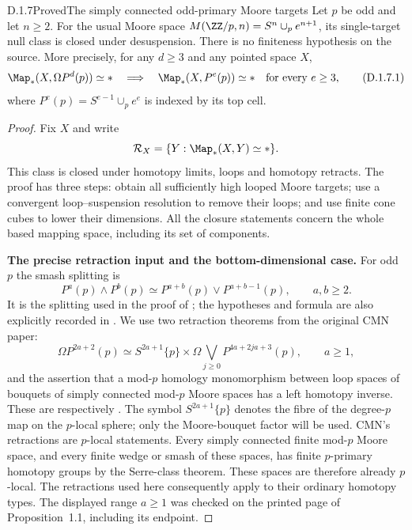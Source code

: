 \begin{claim}{D.1.7}{Proved}{The simply connected odd-primary Moore targets}
Let $p$ be odd and let $n\geq2$. For the usual Moore space
$M(\ZZ/p,n)=S^n\cup_p e^{n+1}$, its single-target null class is
closed under desuspension. There is no finiteness hypothesis on the
source. More precisely, for any $d\geq3$ and any pointed space $X$,
\[
 \Map_*(X,\Omega P^d(p))\simeq *
 \quad\Longrightarrow\quad
 \Map_*(X,P^e(p))\simeq *\quad\hbox{for every }e\geq3,
 \tag{D.1.7.1}
\]
where $P^e(p)=S^{e-1}\cup_p e^e$ is indexed by its top cell.
\end{claim}
\begin{proof}
Fix $X$ and write
\[
 \mathcal R_X=\{Y:\Map_*(X,Y)\simeq *\}.
\]
This class is closed under homotopy limits, loops and homotopy
retracts. The proof has three steps: obtain all sufficiently high
looped Moore targets; use a convergent loop--suspension resolution
to remove their loops; and use finite cone cubes to lower their
dimensions. All the closure statements concern the whole based
mapping space, including its set of components.

\medskip\noindent
\textbf{The precise retraction input and the bottom-dimensional case.}
For odd $p$ the smash splitting is
\[
 P^a(p)\wedge P^b(p)
       \simeq P^{a+b}(p)\vee P^{a+b-1}(p),\qquad a,b\geq2.
 \tag{D.1.7.2}
\]
It is the splitting used in the proof of
\cite[Lemma~1.5, pp.~13--14]{I_CMN1987}; the hypotheses and formula
are also explicitly recorded in \cite[Lemma~4.5]{I_Boyde2021}.
We use two retraction theorems from the original CMN paper:
\[
 \Omega P^{2a+2}(p)
 \simeq S^{2a+1}\{p\}\times
       \Omega\bigvee_{j\geq0}P^{4a+2ja+3}(p),
       \qquad a\geq1,                              \tag{D.1.7.3}
\]
and the assertion that a mod-$p$ homology monomorphism between
loop spaces of bouquets of simply connected mod-$p$ Moore spaces
has a left homotopy inverse. These are respectively
\cite[Proposition~1.1, p.~9, and Proposition~1.7, p.~15]{I_CMN1987}.
The symbol $S^{2a+1}\{p\}$ denotes the fibre of the degree-$p$
map on the $p$-local sphere; only the Moore-bouquet factor will be
used. CMN's retractions are $p$-local statements. Every simply
connected finite mod-$p$ Moore space, and every finite wedge or
smash of these spaces, has finite $p$-primary homotopy groups by
the Serre-class theorem. These spaces are therefore already
$p$-local. The retractions used here consequently apply to their
ordinary homotopy types. The displayed range $a\geq1$ was checked
on the printed page of Proposition~1.1, including its endpoint.


\end{proof}
